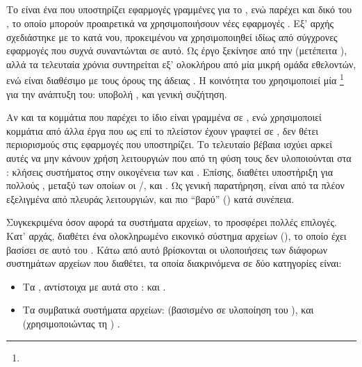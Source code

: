 \subsection{\osv{}}
Το \osv{} είναι ένα  που υποστηρίζει εφαρμογές γραμμένες
για το \linux{}, ενώ παρέχει και δικό του , το οποίο μπορούν
προαιρετικά να χρησιμοποιήσουν νέες εφαρμογές \cite{osv}. Εξ' αρχής σχεδιάστηκε
με το  κατά νου, προκειμένου να χρησιμοποιηθεί ιδίως από σύγχρονες
εφαρμογές που συχνά συναντώνται σε αυτό. Ως έργο ξεκίνησε από την  (μετέπειτα ), αλλά τα τελευταία χρόνια συντηρείται εξ'
ολοκλήρου από μία μικρή ομάδα εθελοντών, ενώ είναι διαθέσιμο με τους όρους της
άδειας . Η κοινότητα του χρησιμοποιεί μία %
\footnote{}
για την ανάπτυξη του: υποβολή ,  και γενική
συζήτηση.

Αν και τα κομμάτια που παρέχει το ίδιο είναι γραμμένα σε , ενώ
χρησιμοποιεί κομμάτια από άλλα έργα που ως επί το πλείστον έχουν γραφτεί σε
, δεν θέτει περιορισμούς στις εφαρμογές που υποστηρίζει. Το
τελευταίο βέβαια ισχύει αρκεί αυτές να μην κάνουν χρήση λειτουργιών που από τη
φύση τους δεν υλοποιούνται στα : κλήσεις συστήματος στην
οικογένεια των \texttt{} και \texttt{}. Επίσης, διαθέτει
υποστήριξη για πολλούς , μεταξύ των οποίων οι \qemu{}/,
 και  \cite{firecracker}.
Ως γενική παρατήρηση, είναι από τα πλέον εξελιγμένα  από πλευράς
λειτουργιών, και πιο ``βαρύ'' () κατά συνέπεια.

Συγκεκριμένα όσον αφορά τα συστήματα αρχείων, το \osv{} προσφέρει πολλές
επιλογές. Κατ' αρχάς, διαθέτει ένα ολοκληρωμένο εικονικό σύστημα αρχείων
(), το οποίο έχει βασίσει σε αυτό του 
\cite{prex}.
Κάτω από αυτό βρίσκονται οι υλοποιήσεις των διάφορων συστημάτων αρχείων που
διαθέτει, τα οποία διακρινόμενα σε δύο κατηγορίες είναι:
\begin{itemize}
    \item Τα , αντίστοιχα με αυτά στο \linux{}:
         και .
    \item Τα συμβατικά συστήματα αρχείων:  (βασισμένο σε υλοποίηση του
        ),  και  (χρησιμοποιώντας τη )
        \cite{libnfs}.
\end{itemize}

